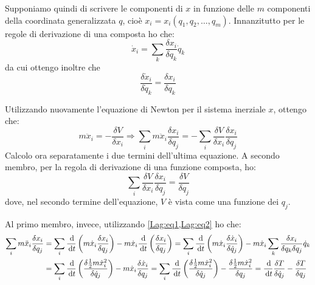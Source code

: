 \documentclass[../main.tex]{subfiles}
\begin{document}
Supponiamo quindi di scrivere le componenti di $x$ in funzione delle $m$ componenti della coordinata generalizzata $q$, cioè $x_i=x_i(q_1,q_2,\dots,q_m)$. Innanzitutto per le regole di derivazione di una composta ho che:
\begin{equation}\label{Lag:eq1}
	\dot x_i=\sum_k \frac{\delta x_i}{\delta q_k}\dot q_k
\end{equation}
da cui ottengo inoltre che 
\begin{equation}\label{Lag:eq2}
	\frac{\delta \dot x_i}{\delta \dot q_k}=\frac{\delta x_i}{\delta q_k}
\end{equation}

Utilizzando nuovamente l'equazione di Newton per il sistema inerziale $x$, ottengo che:
\begin{equation*}
	m \ddot x_i=-\frac{\delta V}{\delta x_i} \Longrightarrow \sum_i m \ddot x_i \frac{\delta x_i}{\delta q_j}=-\sum_i\frac{\delta V}{\delta x_i} \frac{\delta x_i}{\delta q_j}
\end{equation*}
Calcolo ora separatamente i due termini dell'ultima equazione. A secondo membro, per la regola di derivazione di una funzione composta, ho:
\begin{equation}\label{Lag:ParzialePotenziale}
	\sum_i\frac{\delta V}{\delta x_i} \frac{\delta x_i}{\delta q_j}=\frac{\delta V}{\delta q_j}
\end{equation}
dove, nel secondo termine dell'equazione, $V$ è vista come una funzione dei $q_j$.

Al primo membro, invece, utilizzando \cref{Lag:eq1,Lag:eq2} ho che:
\begin{equation}\label{Lag:ParzialeCinetica}\begin{split}
	\sum_i m \ddot x_i \frac{\delta x_i}{\delta q_j} &=
	\sum_i \frac{\,\mathrm{d}}{\,\mathrm{d} t}\left(m \dot x_i \frac{\delta x_i}{\delta q_j}\right) - m \dot x_i\frac{\,\mathrm{d}}{\,\mathrm{d} t}\left( \frac{\delta x_i}{\delta q_j}\right)= 
	\sum_i \frac{\,\mathrm{d}}{\,\mathrm{d} t}\left(m \dot x_i \frac{\delta \dot x_i}{\delta \dot q_j}\right) - m \dot x_i\sum_k\frac{\delta x_i}{\delta q_k\delta q_j}\dot q_k\\
	& = \sum_i \frac{\,\mathrm{d}}{\,\mathrm{d} t}\left(\frac{\delta \frac 12 m \dot x_i^2}{\delta \dot q_j}\right) - m \dot x_i\frac{\delta \dot x_i}{\delta q_j} =
	\sum_i \frac{\,\mathrm{d}}{\,\mathrm{d} t}\left(\frac{\delta \frac 12 m \dot x_i^2}{\delta \dot q_j}\right) - \frac{\delta \frac 12 m \dot x_i^2}{\delta q_j} =\frac{\,\mathrm{d}}{\,\mathrm{d} t}\frac{\delta T}{\delta \dot q_j} - \frac{\delta T}{\delta q_j}
\end{split}\end{equation}
\end{document}
